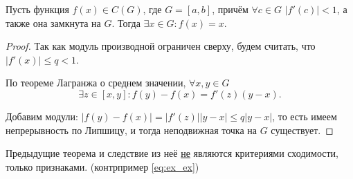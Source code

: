 \documentclass[../main.tex]{subfile}
\begin{document}
\begin{corollary}\label{eq:derivative_condition}
	Пусть функция $f(x)\in C(G)$, где $G=[a,b]$, причём $\forall c\in G$
	$|f'(c)|<1$, а также она замкнута на $G$. Тогда $\exists x\in G: f(x)=x$.
\end{corollary}

\begin{proof}
	Так как модуль производной ограничен сверху, будем считать, что
	$|f'(x)|\le q<1$.

	По теореме Лагранжа о среднем значении, $\forall x,y\in G$ \\
	\[\exists z\in[x,y]: f(y)-f(x)=f'(z)(y-x).\]

	Добавим модули: $|f(y)-f(x)|=|f'(z)||y-x|\le q|y-x|$, то есть имеем
	непрерывность по Липшицу, и тогда неподвижная точка на $G$ существует.
\end{proof}

\begin{remark}
	Предыдущие теорема и следствие из неё \underline{не} являются критериями
	сходимости, только признаками. (контрпример \eqref{eq:ex_ex})
\end{remark}
\end{document}
